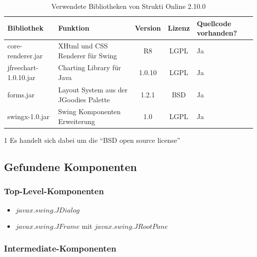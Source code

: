   \begin{table}[ht]
    \sffamily 
    \begin{center}
      \begin{threeparttable}
        \begin{tabular}{lp{4.5cm}ccp{2cm}}
          \toprule
          Bibliothek & Funktion & Version & Lizenz & Quellcode vorhanden?\\
          \midrule
          core-renderer.jar & XHtml und CSS Renderer für Swing & R8 & LGPL &
          Ja\\
          jfreechart-1.0.10.jar & Charting Library für Java & 1.0.10 & LGPL
          & Ja\\
          forms.jar & Layout System aus der JGoodies Palette & 1.2.1 &
          BSD\tnote{1} & Ja\\
          swingx-1.0.jar & Swing Komponenten Erweiterung & 1.0 & LGPL & Ja\\
          \bottomrule
        \end{tabular}
        \caption{Verwendete Bibliotheken von Strukti Online 2.10.0}
        \label{tab:bibliothekenStruktiOnline}
        \begin{tablenotes}[++]\footnotesize 
          \item[1] Es handelt sich dabei um die ``BSD open source license''
        \end{tablenotes} 
      \end{threeparttable}
    \end{center}
  \end{table}
  
  \subsection{Gefundene Komponenten}
  
  \subsubsection{Top-Level-Komponenten}
  
  \begin{itemize}
    \item \(javax.swing.JDialog\)
    \item \(javax.swing.JFrame\) mit \(javax.swing.JRootPane\)
  \end{itemize}
  
  \subsubsection{Intermediate-Komponenten}
  
